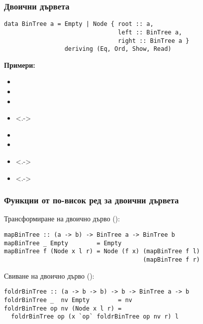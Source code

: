\documentclass[alsotrans]{beamerswitch}
\begin{document}
\begin{frame}[fragile]
  \frametitle{Двоични дървета}
\begin{lstlisting}
data BinTree a = Empty | Node { root :: a,
                                left :: BinTree a,
                                right :: BinTree a }
                 deriving (Eq, Ord, Show, Read)
\end{lstlisting}
  \textbf{Примери:}
  \begin{itemize}[<+->]
  \item {}
  \item {}
  \item {}
  \item<.-> 
  \item {}
  \item {}
  \item<.-> 
  \item<.-> 
  \end{itemize}
\end{frame}

\begin{frame}[fragile]
  \frametitle{Функции от по-висок ред за двоични дървета}

  Трансформиране на двоично дърво ():
  \pause
\begin{lstlisting}
mapBinTree :: (a -> b) -> BinTree a -> BinTree b
mapBinTree _ Empty        = Empty
mapBinTree f (Node x l r) = Node (f x) (mapBinTree f l)
                                       (mapBinTree f r)
\end{lstlisting}
  \vspace{4ex}
  \pause
  Свиване на двоично дърво ():
\begin{lstlisting}
foldrBinTree :: (a -> b -> b) -> b -> BinTree a -> b
foldrBinTree _  nv Empty        = nv
foldrBinTree op nv (Node x l r) =
  foldrBinTree op (x `op` foldrBinTree op nv r) l
\end{lstlisting}
\end{frame}
\end{document}
